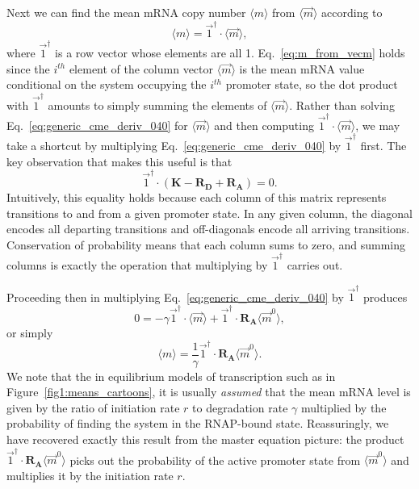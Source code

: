 Next we can find the mean mRNA copy number $\langle{m}\rangle$ from
$\langle\vec{m}\rangle$ according to
\begin{equation}
\langle{m}\rangle = \vec{1}^\dagger\cdot\langle\vec{m}\rangle,
\label{eq:m_from_vecm}
\end{equation}
where $\vec{1}^\dagger$ is a row vector whose elements are all 1.
Eq.~\ref{eq:m_from_vecm} holds since the $i^{th}$ element of the column vector
$\langle\vec{m}\rangle$ is the mean mRNA value conditional on the system
occupying the $i^{th}$ promoter state, so the dot product with $\vec{1}^\dagger$
amounts to simply summing the elements of $\langle\vec{m}\rangle$. Rather than
solving Eq.~\ref{eq:generic_cme_deriv_040} for $\langle\vec{m}\rangle$ and then
computing $\vec{1}^\dagger\cdot\langle\vec{m}\rangle$, we may take a shortcut by
multiplying Eq.~\ref{eq:generic_cme_deriv_040} by $\vec{1}^\dagger$ first. The
key observation that makes this useful is that
\begin{equation}
\vec{1}^\dagger \cdot (\mathbf{K} - \mathbf{R_D} + \mathbf{R_A}) = 0.
\end{equation}
Intuitively, this equality holds because each column of this matrix
represents transitions to and from a given promoter state. In any given column,
the diagonal encodes all departing transitions and off-diagonals encode all
arriving transitions. Conservation of probability means that each column
sums to zero, and summing columns is exactly the operation that multiplying by
$\vec{1}^\dagger$ carries out.

Proceeding then in multiplying Eq.~\ref{eq:generic_cme_deriv_040} by
$\vec{1}^\dagger$ produces
\begin{equation}
0 = -\gamma \vec{1}^\dagger\cdot\langle\vec{m}\rangle
+ \vec{1}^\dagger\cdot\mathbf{R_A}\langle\vec{m}^0\rangle,
\end{equation}
or simply
\begin{equation}
\langle{m}\rangle
= \frac{1}{\gamma} \vec{1}^\dagger\cdot\mathbf{R_A}\langle\vec{m}^0\rangle.
\label{eq:generic_mean_m_appdx}
\end{equation}
We note that the in equilibrium models of transcription such as in
Figure~\ref{fig1:means_cartoons}, it is usually \textit{assumed} that the mean
mRNA level is given by the ratio of initiation rate $r$ to degradation rate
$\gamma$ multiplied by the probability of finding the system in the RNAP-bound
state. Reassuringly, we have recovered exactly this result from the master
equation picture: the product
$\vec{1}^\dagger\cdot\mathbf{R_A}\langle\vec{m}^0\rangle$ picks out the
probability of the active promoter state from $\langle\vec{m}^0\rangle$ and
multiplies it by the initiation rate $r$.

